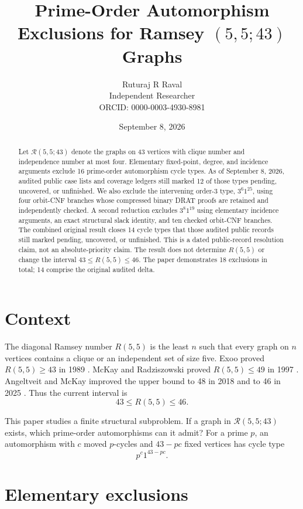 \documentclass[11pt]{article}
\title{Prime-Order Automorphism Exclusions for Ramsey $(5,5;43)$ Graphs}
\author{Ruturaj R Raval\\Independent Researcher\\
ORCID: 0000-0003-4930-8981}
\date{September 8, 2026}
\newcommand{\Rcal}{\mathcal{R}}
\begin{document}
\maketitle

\begin{abstract}
Let $\Rcal(5,5;43)$ denote the graphs on 43 vertices with clique number and
independence number at most four. Elementary fixed-point, degree, and
incidence arguments exclude 16 prime-order automorphism cycle types. As of
September 8, 2026, audited public case lists and coverage ledgers still
marked 12 of those types pending, uncovered, or unfinished. We also exclude
the intervening order-3 type, $3^6 1^{25}$,
using four orbit-CNF branches whose compressed binary DRAT proofs are
retained and independently checked. A second reduction excludes
$3^8 1^{19}$ using elementary incidence arguments, an exact structural
slack identity, and ten checked orbit-CNF branches. The combined original
result closes 14 cycle types that those audited public records still marked
pending, uncovered, or unfinished. This is a dated public-record resolution
claim, not an absolute-priority claim. The result does not determine
$R(5,5)$ or change the interval $43 \le R(5,5) \le 46$.
The paper demonstrates 18 exclusions in total; 14 comprise the original
audited delta.
\end{abstract}

\section{Context}

The diagonal Ramsey number $R(5,5)$ is the least $n$ such that every graph on
$n$ vertices contains a clique or an independent set of size five. Exoo
proved $R(5,5)\ge 43$ in 1989 \cite{Exoo1989}. McKay and Radziszowski proved
$R(5,5)\le49$ in 1997 \cite{McKayRadziszowski1997}. Angeltveit and McKay
improved the upper bound to 48 in 2018 \cite{AngeltveitMcKay2018} and to 46
in 2025 \cite{AngeltveitMcKay2025}. Thus the current interval is
\[
43 \le R(5,5) \le 46.
\]

This paper studies a finite structural subproblem. If a graph in
$\Rcal(5,5;43)$ exists, which prime-order automorphisms can it admit? For a
prime $p$, an automorphism with $c$ moved $p$-cycles and $43-pc$ fixed
vertices has cycle type
\[
p^c 1^{43-pc}.
\]

\section{Elementary exclusions}
\end{document}
